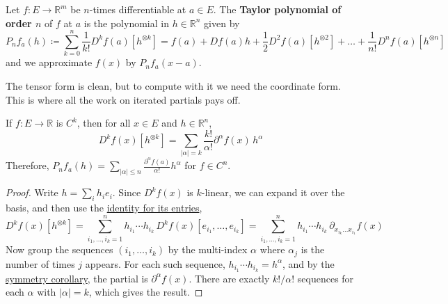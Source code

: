   \begin{definition}
    \label{def:taylor-polynomial}
    Let $f: E \to \mathbb{R}^m$ be $n$-times differentiable at $a \in E$. The \textbf{Taylor polynomial of order $n$} of $f$ at $a$ is the polynomial in $h \in \mathbb{R}^n$ given by
    \begin{equation}
      P_n f_a (h) \coloneqq \sum_{k=0}^n \frac{1}{k!} D^k f(a) [h^{\otimes k}] = f(a) + Df(a) h + \frac{1}{2} D^2 f(a) [h^{\otimes 2}] + \ldots + \frac{1}{n!} D^n f(a) [h^{\otimes n}]
    \end{equation}
    and we approximate $f(x)$ by $P_n f_a (x - a)$. 
  \end{definition}

  The tensor form is clean, but to compute with it we need the coordinate form. This is where all the work on iterated partials pays off. 

  \begin{lemma}
    \label{thm:coordinate-form-of-kth-term}
    If $f: E \to \mathbb{R}$ is $C^k$, then for all $x \in E$ and $h \in \mathbb{R}^n$, 
    \begin{equation}
      D^k f(x) [h^{\otimes k}] = \sum_{|\alpha| = k} \frac{k!}{\alpha!} \partial^\alpha f(x) \, h^\alpha
    \end{equation}
    Therefore, $P_n f_a (h) = \sum_{|\alpha| \leq n} \frac{\partial^\alpha f(a)}{\alpha!} h^\alpha$ for $f \in C^n$. 
  \end{lemma}
  \begin{proof}
    Write $h = \sum_i h_i e_i$. Since $D^k f(x)$ is $k$-linear, we can expand it over the basis, and then use the \hyperref[def:ck_functions]{identity for its entries}, 
    \begin{equation}
      D^k f(x) [h^{\otimes k}] = \sum_{i_1, \ldots, i_k = 1}^n h_{i_1} \cdots h_{i_k} \, D^k f(x) [e_{i_1}, \ldots, e_{i_k}] = \sum_{i_1, \ldots, i_k = 1}^n h_{i_1} \cdots h_{i_k} \, \partial_{x_{i_k} \ldots x_{i_1}} f(x)
    \end{equation}
    Now group the sequences $(i_1, \ldots, i_k)$ by the multi-index $\alpha$ where $\alpha_j$ is the number of times $j$ appears. For each such sequence, $h_{i_1} \cdots h_{i_k} = h^\alpha$, and by the \hyperref[thm:symmetry-in-kth-iterated-partials]{symmetry corollary}, the partial is $\partial^\alpha f(x)$. There are exactly $k!/\alpha!$ sequences for each $\alpha$ with $|\alpha| = k$, which gives the result. 
  \end{proof}

